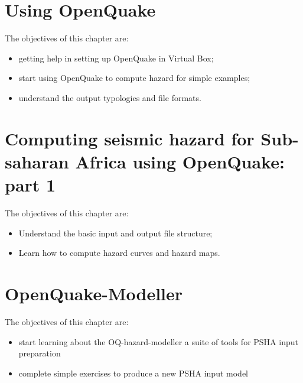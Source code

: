 \documentclass[11pt,a4paper,headings=small,dvips]{scrbook}
\newenvironment{myfancybox}{%
  \def\FrameCommand{\fboxsep=\FrameSep \fcolorbox{blue01}{honeydew}}%
  \color{black}\MakeFramed {\FrameRestore}}%
 {\endMakeFramed}
\begin{document}
\chapter{Using OpenQuake}
\begin{myfancybox}
The objectives of this chapter are:
\begin{itemize}
    \item getting help in setting up OpenQuake in Virtual Box;
    \item start using OpenQuake to compute hazard for simple examples;
    \item understand the output typologies and file formats.
\end{itemize}
\end{myfancybox}
    
    \clearpage
    
\chapter{Computing seismic hazard for Sub-saharan Africa using OpenQuake: part 1}
\begin{myfancybox}
The objectives of this chapter are:
\begin{itemize}
    \item Understand the basic input and output file structure;
    \item Learn how to compute hazard curves and hazard maps.
\end{itemize}
\end{myfancybox}
    
    
\cleardoublepage
\chapter{OpenQuake-Modeller}
\begin{myfancybox}
The objectives of this chapter are:
\begin{itemize}
    \item start learning about the OQ-hazard-modeller a suite of tools for 
        PSHA input preparation
    \item complete simple exercises to produce a new PSHA input model 
\end{itemize}
\end{myfancybox}
  
\cleardoublepage
\end{document}
